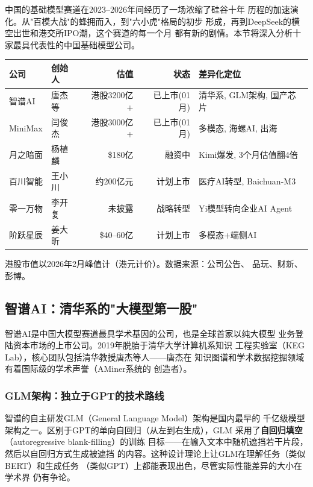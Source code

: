 中国的基础模型赛道在2023--2026年间经历了一场浓缩了硅谷十年
历程的加速演化。从"百模大战"的蜂拥而入，到"六小虎"格局的初步
形成，再到DeepSeek的横空出世和港交所IPO潮，这个赛道的每一个月
都有新的剧情。本节将深入分析十家最具代表性的中国基础模型公司。

\begin{keybox}
\small
\begin{tabularx}{\textwidth}{l l r r X}
\toprule
\rowcolor{figLightGray}
\textbf{公司} & \textbf{创始人} & \textbf{估值} & \textbf{状态} & \textbf{差异化定位} \\
\midrule
智谱AI      & 唐杰等  & 港股3200亿+  & 已上市(01月)& 清华系, GLM架构, 国产芯片 \\
MiniMax     & 闫俊杰  & 港股3000亿+  & 已上市(01月)& 多模态, 海螺AI, 出海 \\
月之暗面    & 杨植麟  & \$180亿      & 融资中    & Kimi爆发, 3个月估值翻4倍 \\
百川智能    & 王小川  & 约200亿元    & 计划上市  & 医疗AI转型, Baichuan-M3 \\
零一万物    & 李开复  & 未披露       & 战略转型  & Yi模型转向企业AI Agent \\
阶跃星辰    & 姜大昕  & \$40--60亿   & 计划上市  & 多模态+端侧AI \\
\bottomrule
\end{tabularx}

\medskip
\noindent 港股市值以2026年2月峰值计（港元计价）。数据来源：公司公告、
品玩、财新、彭博。
\end{keybox}

\subsection{智谱AI：清华系的"大模型第一股"}
\label{subsec:zhipu}

智谱AI是中国大模型赛道最具学术基因的公司，也是全球首家以纯大模型
业务登陆资本市场的上市公司。2019年脱胎于清华大学计算机系知识
工程实验室（KEG Lab），核心团队包括清华教授唐杰等人——唐杰在
知识图谱和学术数据挖掘领域有着国际级的学术声誉（AMiner系统的
创造者）。

\subsubsection{GLM架构：独立于GPT的技术路线}
智谱的自主研发GLM（General Language Model）架构是国内最早的
千亿级模型架构之一。区别于GPT的单向自回归（从左到右生成），GLM
采用了\textbf{自回归填空}（autoregressive blank-filling）的训练
目标——在输入文本中随机遮挡若干片段，然后以自回归方式生成被遮挡
的内容。这种设计理论上让GLM在理解任务（类似BERT）和生成任务
（类似GPT）上都能表现出色，尽管实际性能差异的大小在学术界
仍有争论。

